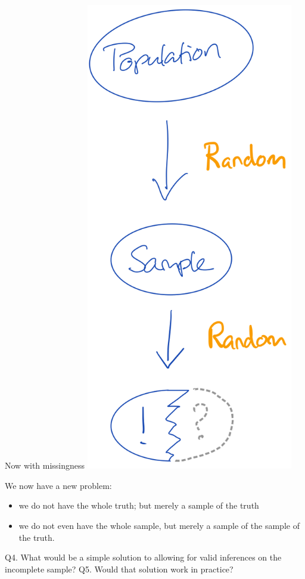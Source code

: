\documentclass[
  ignorenonframetext,
]{beamer}
\providecommand{\tightlist}{%
  \setlength{\itemsep}{0pt}\setlength{\parskip}{0pt}}\usepackage{longtable,booktabs,array}
\begin{document}
\begin{frame}{Now with missingness}
\protect\hypertarget{now-with-missingness-1}{}
\includegraphics[width=0.68\textwidth,height=\textheight]{img/10. missingness_simplified.png}

We now have a new problem:

\begin{itemize}
\tightlist
\item
  we do not have the whole truth; but merely a sample of the truth
\item
  we do not even have the whole sample, but merely a sample of the
  sample of the truth.
\end{itemize}

Q4. What would be a simple solution to allowing for valid inferences on
the incomplete sample? Q5. Would that solution work in practice?
\end{frame}
\end{document}
